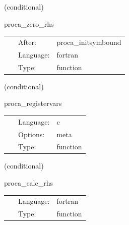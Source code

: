 \vspace{5mm}

   (conditional) 

\hspace{5mm} proca\_zero\_rhs 

\hspace{5mm}{\it set all rhs functions to zero to prevent spurious nans } 


\hspace{5mm}

 \begin{tabular*}{160mm}{cll} 
~ & After:  & proca\_initsymbound \\ 
~ & Language:  & fortran \\ 
~ & Type:  & function \\ 
\end{tabular*} 


\vspace{5mm}

   (conditional) 

\hspace{5mm} proca\_registervars 

\hspace{5mm}{\it register variables for mol } 


\hspace{5mm}

 \begin{tabular*}{160mm}{cll} 
~ & Language:  & c \\ 
~ & Options:  & meta \\ 
~ & Type:  & function \\ 
\end{tabular*} 


\vspace{5mm}

   (conditional) 

\hspace{5mm} proca\_calc\_rhs 

\hspace{5mm}{\it mol rhs calculation for proca variables } 


\hspace{5mm}

 \begin{tabular*}{160mm}{cll} 
~ & Language:  & fortran \\ 
~ & Type:  & function \\ 
\end{tabular*} 


